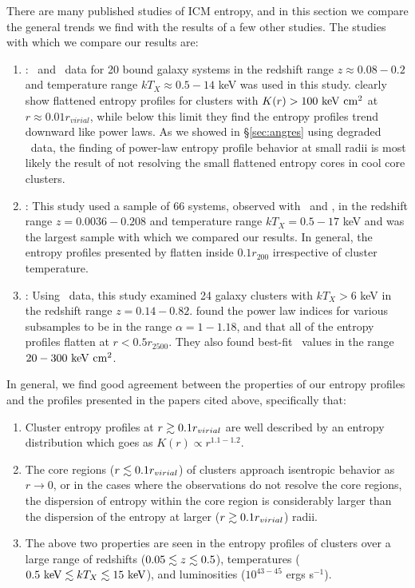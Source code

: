 \documentclass[12pt,preprint]{aastex}
\begin{document}
There are many published studies of ICM entropy, and in this section
we compare the general trends we find with the results of a few other
studies. The studies with which we compare our results are:
\begin{enumerate}
\item \citet{davies00}: \rosat\ and \asca\ data for 20 bound galaxy
  systems in the redshift range $z \approx 0.08-0.2$ and temperature
  range $kT_X \approx 0.5-14$ keV was used in this
  study. \citet{davies00} clearly show flattened entropy profiles for
  clusters with $K(r) > 100 \mathrm{\mbox{\ensuremath{\mathrm{~keV}}} \mathrm{\mbox{\ensuremath{\mathrm{~cm}}}^2}}$ at $r \approx 0.01 r_{virial}$,
  while below this limit they find the entropy profiles trend downward
  like power laws. As we showed in \S\ref{sec:angres} using degraded
  \xmm\ data, the finding of power-law entropy profile behavior at
  small radii is most likely the result of not resolving the small
  flattened entropy cores in cool core clusters.
\item \citet{ponman03}: This study used a sample of 66 systems,
  observed with \rosat\ and \asca, in the redshift range $z=
  0.0036-0.208$ and temperature range $kT_X = 0.5-17$ keV and was the
  largest sample with which we compared our results. In general, the
  entropy profiles presented by \citet{ponman03} flatten inside $0.1
  r_{200}$ irrespective of cluster temperature.
\item \citet{morandi07}: Using \chandra\ data, this study examined 24
  galaxy clusters with $kT_X > 6$ keV in the redshift range
  $z=0.14-0.82$. \citet{morandi07} found the power law indices for
  various subsamples to be in the range $\alpha=1-1.18$, and that all
  of the entropy profiles flatten at $r < 0.5r_{2500}$. They also
  found best-fit \kna\ values in the range $20-300 \mathrm{\mbox{\ensuremath{\mathrm{~keV}}} \mathrm{\mbox{\ensuremath{\mathrm{~cm}}}^2}}$.
\end{enumerate}

In general, we find good agreement between the properties of our
entropy profiles and the profiles presented in the papers cited above,
specifically that:
\begin{enumerate}
\item Cluster entropy profiles at $r \gtrsim 0.1 r_{virial}$ are well
  described by an entropy distribution which goes as $K(r) \propto
  r^{1.1-1.2}$.
\item The core regions ($r \lesssim 0.1 r_{virial}$) of clusters approach
  isentropic behavior as $r \rightarrow 0$, or in the cases where the
  observations do not resolve the core regions, the dispersion of
  entropy within the core region is considerably larger than the
  dispersion of the entropy at larger ($r \gtrsim 0.1 r_{virial}$) radii.
\item The above two properties are seen in the entropy profiles of
  clusters over a large range of redshifts ($0.05 \lesssim z \lesssim 0.5$),
  temperatures ($0.5 \mbox{\ensuremath{\mathrm{~keV}}} \lesssim kT_X \lesssim 15 \mbox{\ensuremath{\mathrm{~keV}}}$), and luminosities
  ($10^{43-45}$ ergs s$^{-1}$).
\end{enumerate}  
\end{document}
